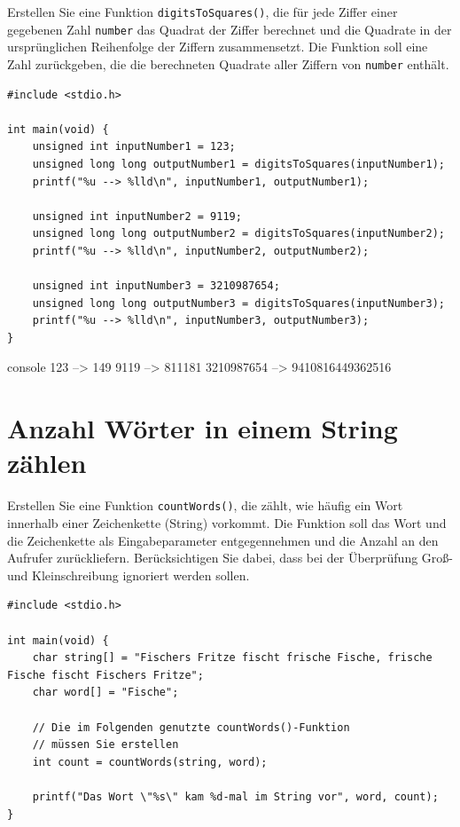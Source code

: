 \vspace{10pt}

Erstellen Sie eine Funktion \texttt{digitsToSquares()}, die für jede
Ziffer einer gegebenen Zahl \texttt{number} das Quadrat der Ziffer
berechnet und die Quadrate in der ursprünglichen Reihenfolge der Ziffern
zusammensetzt. Die Funktion soll eine Zahl zurückgeben, die die berechneten
Quadrate aller Ziffern von \texttt{number} enthält.

\Vorlage
\begin{verbatim}
#include <stdio.h>

int main(void) {
    unsigned int inputNumber1 = 123;
    unsigned long long outputNumber1 = digitsToSquares(inputNumber1);
    printf("%u --> %lld\n", inputNumber1, outputNumber1);

    unsigned int inputNumber2 = 9119;
    unsigned long long outputNumber2 = digitsToSquares(inputNumber2);
    printf("%u --> %lld\n", inputNumber2, outputNumber2);

    unsigned int inputNumber3 = 3210987654;
    unsigned long long outputNumber3 = digitsToSquares(inputNumber3);
    printf("%u --> %lld\n", inputNumber3, outputNumber3);
}
\end{verbatim}

\begin{mybox}[title=Bildschirmausgabe]{console}
123 --> 149
9119 --> 811181
3210987654 --> 9410816449362516
\end{mybox}




\chapter{Anzahl Wörter in einem String zählen}

\vspace{10pt}

Erstellen Sie eine Funktion \texttt{countWords()}, die zählt, wie häufig
ein Wort innerhalb einer Zeichenkette (String) vorkommt. Die Funktion soll das
Wort und die Zeichenkette als Eingabeparameter entgegennehmen und die Anzahl an
den Aufrufer zurückliefern. Berücksichtigen Sie dabei, dass bei der Überprüfung
Groß- und Kleinschreibung ignoriert werden sollen.

\Vorlage
\begin{verbatim}
#include <stdio.h>

int main(void) {
    char string[] = "Fischers Fritze fischt frische Fische, frische Fische fischt Fischers Fritze";
    char word[] = "Fische";

    // Die im Folgenden genutzte countWords()-Funktion
    // müssen Sie erstellen
    int count = countWords(string, word);

    printf("Das Wort \"%s\" kam %d-mal im String vor", word, count);
}
\end{verbatim}

